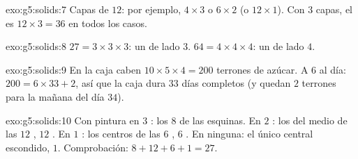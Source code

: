\begin{solution}{exo:g5:solids:7}
Capas de $12$: por ejemplo, $4 \times 3$ o $6 \times 2$ (o
$12 \times 1$). Con $3$ capas, el  es
$12 \times 3 = 36$  en todos los casos.
\end{solution}

\begin{solution}{exo:g5:solids:8}
$27 = 3 \times 3 \times 3$: un  de lado $3$.
$64 = 4 \times 4 \times 4$: un  de lado $4$.
\end{solution}

\begin{solution}{exo:g5:solids:9}
En la caja caben $10 \times 5 \times 4 = 200$ terrones de azúcar. A $6$ al
día: $200 = 6 \times 33 + 2$, así que la caja dura $33$ días completos (y
quedan $2$ terrones para la mañana del día $34$).
\end{solution}

\begin{solution}{exo:g5:solids:10}
Con pintura en $3$ : los $8$  de las esquinas. En $2$ : los del medio
de las $12$ , $12$ . En $1$ : los centros de las $6$
, $6$ . En ninguna: el único  central escondido, $1$.
Comprobación: $8 + 12 + 6 + 1 = 27$. \checkmark
\end{solution}
